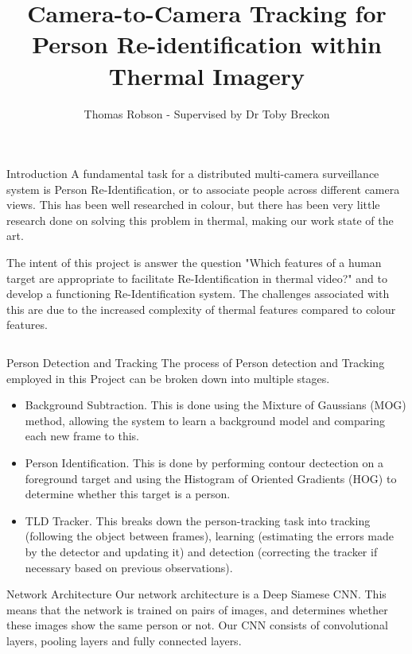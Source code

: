 \documentclass[final]{beamer}
\title[Thermal Re-ID]{Camera-to-Camera Tracking for Person Re-identification within Thermal Imagery}
\author[G Ingram]{Thomas Robson - Supervised by Dr Toby Breckon}
\institute[Durham]{School of Computer Science, Durham University}
\begin{document}
  \begin{frame}{} 

  \vfill
  \begin{block}{Introduction}
          A fundamental task for a distributed multi-camera surveillance system is Person Re-Identification, or to associate people across different camera views. This has been well researched in colour, but there has been very little research done on solving this problem in thermal, making our work state of the art. 

The intent of this project is answer the question "Which features of a human target are appropriate to facilitate Re-Identification in thermal video?" and to develop a functioning Re-Identification system. The challenges associated with this are due to the increased complexity of thermal features compared to colour features.
        \end{block}
        
    \begin{columns}[t]
      \begin{column}{.49\linewidth}
        
        \begin{block}{Person Detection and Tracking}
        	The process of Person detection and Tracking employed in this Project can be broken down into multiple stages. 
        	\begin{itemize}
        	\item Background Subtraction. This is done using the Mixture of Gaussians (MOG) method, allowing the system to learn a background model and comparing each new frame to this. 

        	\item Person Identification. This is done by performing contour dectection on a foreground target and using the Histogram of Oriented Gradients (HOG) to determine whether this target is a person.
        	
        	\item TLD Tracker.  This breaks down the person-tracking task into tracking (following the object between frames), learning (estimating the errors made by the detector and updating it) and detection (correcting the tracker if necessary based on previous observations). 
          \end{itemize}
        \end{block}
       


        \begin{block}{Network Architecture}
        Our network architecture is a Deep Siamese CNN. This means that the network is trained on pairs of images, and determines whether these images show the same person or not. Our CNN consists of convolutional layers, pooling layers and fully connected layers. 
        

\end{block}
\end{column}
\end{columns}
\end{frame}
\end{document}
